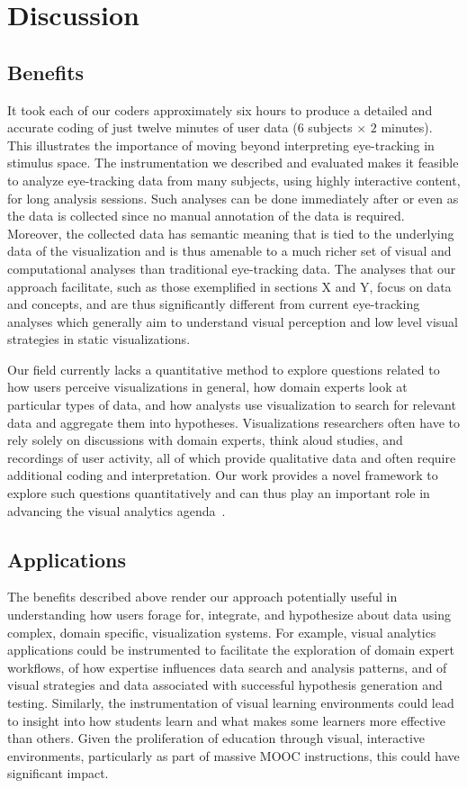 ﻿\section{Discussion}
\label{sec:Discussion}
\subsection{Benefits}
\label{sec:Benefits}

It took each of our coders approximately six hours to produce a detailed and accurate coding of just twelve minutes of user data ($6$ subjects $\times$ $2$ minutes). This illustrates the importance of moving beyond interpreting eye-tracking in stimulus space. The instrumentation we described and evaluated makes it feasible to analyze eye-tracking data from many subjects, using highly interactive content, for long analysis sessions. Such analyses can be done immediately after or even as the data is collected since no manual annotation of the data is required. Moreover, the collected data has semantic meaning that is tied to the underlying data of the visualization and is thus amenable to a much richer set of visual and computational analyses than traditional eye-tracking data. The analyses that our approach facilitate, such as those exemplified in sections X and Y, focus on data and concepts, and are thus significantly different from current eye-tracking analyses which generally aim to understand visual perception and low level visual strategies in static visualizations.

Our field currently lacks a quantitative method to explore questions related to how users perceive visualizations in general, how domain experts look at particular types of data, and how analysts use visualization to search for relevant data and aggregate them into hypotheses. Visualizations researchers often have to rely solely on discussions with domain experts, think aloud studies, and recordings of user activity, all of which provide qualitative data and often require additional coding and interpretation. Our work provides a novel framework to explore such questions quantitatively and can thus play an important role in advancing the visual analytics agenda~\cite{thomas2006visual}.

\subsection{Applications}
\label{sec:Applications}
The benefits described above render our approach potentially useful in understanding how users forage for, integrate, and hypothesize about data using complex, domain specific, visualization systems. For example, visual analytics applications could be instrumented to facilitate the exploration of domain expert workflows, of how expertise influences data search and analysis patterns, and of visual strategies and data associated with successful hypothesis generation and testing. Similarly, the instrumentation of visual learning environments could lead to insight into how students learn and what makes some learners more effective than others. Given the proliferation of education through visual, interactive environments, particularly as part of massive MOOC instructions, this could have significant impact. 

